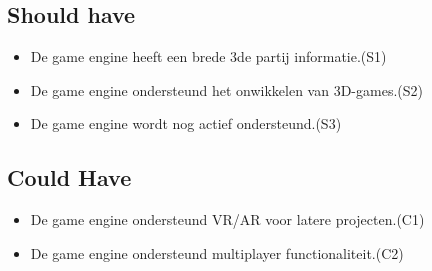 \subsection{Should have}
\begin{itemize}
    \item De game engine heeft een brede 3de partij informatie.(S1)
    \item De game engine ondersteund het onwikkelen van 3D-games.(S2)
    \item De game engine wordt nog actief ondersteund.(S3)
\end{itemize}

\subsection{Could Have}
\begin{itemize}
    \item De game engine ondersteund VR/AR voor latere projecten.(C1)
    \item De game engine ondersteund multiplayer functionaliteit.(C2)
\end{itemize}

